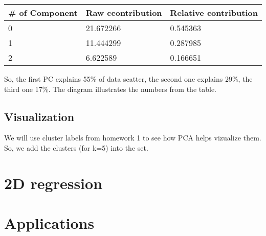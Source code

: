 \documentclass[a4paper,14pt]{article}
\begin{document}
\begin{tabular}{lll}
	\# of Component & Raw ccontribution                     & Relative contribution \\ \hline
	0            & 21.672266                             & 0.545363              \\
	1            & 11.444299                             & 0.287985              \\
	2            & 6.622589  & 0.166651             
\end{tabular}

So, the first PC explains 55\% of data scatter, the second one explains 29\%, the third one 17\%. The diagram illustrates the numbers from the table.

    \begin{center}
\end{center}

\subsection{Visualization}

We will use cluster labels from homework 1 to see how PCA helps vizualize them. So, we add the clusters (for k=5) into the set. 
	

    
    \section{2D regression}
    
    \section{Applications}
    
\end{document}
